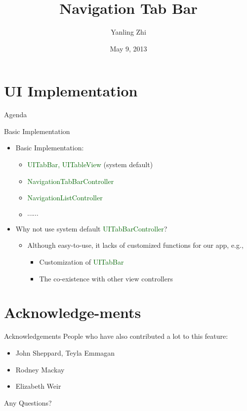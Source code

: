 \documentclass[CJK,notheorems,mathserif,table]{beamer}
\title[Navigation Tab Bar] %
{Navigation Tab Bar}
\author[Yanling Zhi]{Yanling Zhi}
\institute[MicroStrategy Inc.] { %
  iOS Dev Team, MicroStrategy Inc.
}
\date[May 9, 2013] %
{May 9, 2013}
\newcommand{\code}[1]{\textcolor{darkgreen}{\footnotesize #1}} %
\begin{document}
\begin{frame}
  \titlepage
\end{frame}

\section{UI Implementation}

\begin{frame}{Agenda}
\tableofcontents
\end{frame}

\begin{frame}{Basic Implementation}%
  \begin{itemize}
  \item Basic Implementation: 
    \begin{itemize} 
    \item \code{UITabBar, UITableView} (system default)
    \item \code{NavigationTabBarController} 
    \item \code{NavigationListController} 
    \item $\cdots\cdots$
    \end{itemize}
  \item Why not use system default \code{UITabBarController}?
    \begin{itemize}
      \item Although easy-to-use, it lacks of customized functions for our app, e.g., 
      \begin{itemize}
        \item Customization of \code{UITabBar}
        \item The co-existence with other view controllers
      \end{itemize}
    \end{itemize}
  \end{itemize}
\end{frame}


\section{Acknowledge-ments}

\begin{frame}{Acknowledgements}
People who have also contributed a lot to this feature:
\begin{itemize}
  \item John Sheppard, Teyla Emmagan
  \item Rodney Mackay
  \item Elizabeth Weir
\end{itemize}
\end{frame}

\begin{frame}
\begin{center} 
  {\Huge Any Questions?}
\end{center}
\end{frame}
\end{document}
